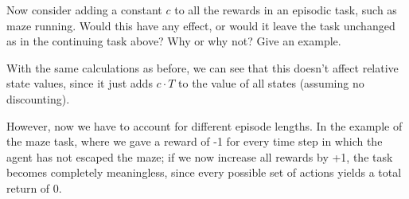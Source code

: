 
\begin{exercise}[Exercise 3.16]

Now consider adding a constant $c$ to all the rewards in an episodic task, such
as maze running. Would this have any effect, or would it leave the task unchanged
as in the continuing task above? Why or why not? Give an example.

\end{exercise}


\begin{solution}

With the same calculations as before, we can see that this doesn't affect relative state values,
since it just adds $c\cdot T$ to the value of all states (assuming no discounting).

However, now we have to account for different episode lengths.
In the example of the maze task, where we gave a reward of -1 for every time step
in which the agent has not escaped the maze; if we now increase all rewards by +1,
the task becomes completely meaningless, since every possible set of actions
yields a total return of 0.

\end{solution}

